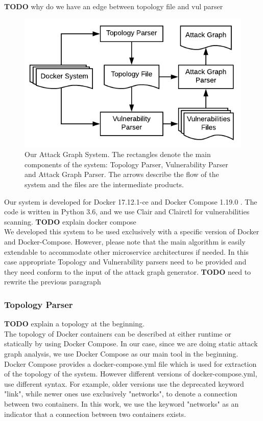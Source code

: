 \textbf{TODO} why do we have an edge between topology file and vul parser\\
\begin{figure}
	\includegraphics[scale=0.9]{./images/AttackGraphSystem}
	\caption{Our Attack Graph System. The rectangles denote the main components of the system: Topology Parser, Vulnerability Parser and Attack Graph Parser. The arrows describe the flow of the system and the files are the intermediate products.}
	\label{AttackGraphSystem}
\end{figure}


Our system is developed for Docker 17.12.1-ce and Docker Compose 1.19.0 \cite{merkel2014docker}. The code is written in Python 3.6, and we use Clair \cite{clair} and Clairctl \cite{clairctl} for vulnerabilities scanning.
\textbf{TODO} explain docker compose \\
We developed this system to be used exclusively with a specific version of Docker and Docker-Compose. However, please note that the main algorithm is easily extendable to accommodate other microservice architectures if needed. In this case appropriate Topology and Vulnerability parsers need to be provided and they need conform to the input of the attack graph generator.
\textbf{TODO} need to rewrite the previous paragraph \\
\subsubsection{Topology Parser}
\label{chap:topology_p}
\textbf{TODO} explain a topology at the beginning.\\
The topology of Docker containers can be described at either runtime or statically by using Docker Compose. In our case, since we are doing static attack graph analysis, we use Docker Compose as our main tool in the beginning. Docker Compose provides a docker-compose.yml file which is used for extraction of the topology of the system. However different versions of docker-compose.yml, use different syntax. For example, older versions use the deprecated keyword "link", while newer ones use exclusively "networks", to denote a connection between two containers. In this work, we use the keyword "networks" as an indicator that a connection between two containers exists.

